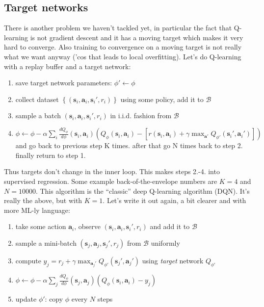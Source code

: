 \documentclass{report}
\begin{document}
\subsection{Target networks}
There is another problem we haven't tackled yet,
in particular the fact that Q-learning is not gradient descent and it has a moving target 
which makes it very hard to converge.
Also training to convergence on a moving target is not really what we want anyway ('cos that leads to local overfitting).
Let's do Q-learning with a replay buffer and a target network:
\begin{enumerate}
		\item save target network parameters: $\phi' \leftarrow \phi$
		\item collect dataset $\left\{ \left( \bm{s}_i, \bm{a}_i, \bm{s}_i', r_i \right)  \right\} $ using some policy, add it to $\mathcal{B}$
		\item sample a batch  $\left( \bm{s}_i, \bm{a}_i, \bm{s}_i', r_i \right)$ in i.i.d. fashion from $\mathcal{B}$
		\item $  \phi \leftarrow \phi  - \alpha \sum_{i}^{}  \frac{d Q_\phi}{d\phi} (\bm{s}_{i}, \bm{a}_{i}) \left( Q_\phi(\bm{s}_{i}, \bm{a}_{i}) - 
				\left[ r(\bm{s}_{i}, \bm{a}_{i}) + \gamma \max_{\bm{a}'} Q_{\phi'} (\bm{s}_{i}', \bm{a}_{i}') \right] 	\right) $ 
				and go back to previous step K times. after that go N times back to step 2. finally return to step 1.
\end{enumerate}
Thus targets don't change in the inner loop. This makes steps 2.-4. into supervised regression.
Some example back-of-the-envelope numbers are $K=4$ and $N=10000$.
This algorithm is the ``classic'' deep Q-learning algorithm (DQN).
It's really the above, but with $K=1$.
Let's write it out again, a bit clearer and with more ML-ly language:
\begin{enumerate}
		\item take some action $\bm{a}_i$,  observe $\left( \bm{s}_i, \bm{a}_i, \bm{s}_i', r_i \right)$ and add it to $\mathcal{B}$
		\item sample a mini-batch  $\left( \bm{s}_j, \bm{a}_j, \bm{s}_j', r_j \right)$  from $\mathcal{B}$ uniformly
		\item compute $y_j = r_j + \gamma \max_{\bm{a}_j'} Q_{\phi'} (\bm{s}_{j}', \bm{a}_{j}')$ using \textit{target} network $Q_{\phi'}$
		\item $  \phi \leftarrow \phi  - \alpha \sum_{j}^{}  \frac{d Q_\phi}{d\phi} (\bm{s}_{j}, \bm{a}_{j}) \left( Q_\phi(\bm{s}_{i}, \bm{a}_{i}) - 
				y_j 	\right) $ 
		\item update $\phi'$: copy $\phi$ every $N$ steps
\end{enumerate}
\end{document}
